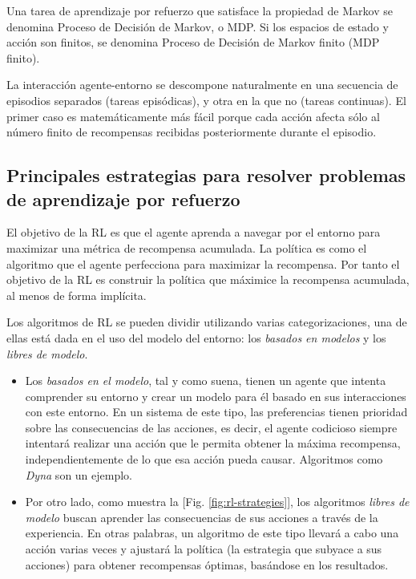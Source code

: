 Una tarea de aprendizaje por refuerzo que satisface la propiedad de Markov se denomina Proceso de Decisión de Markov, o MDP. Si los espacios de estado y acción son finitos, se denomina Proceso de Decisión de Markov finito (MDP finito).

La interacción agente-entorno se descompone naturalmente en una secuencia de episodios separados (tareas episódicas), y otra en la que no (tareas continuas). El primer caso es matemáticamente más fácil porque cada acción afecta sólo al número finito de recompensas recibidas posteriormente durante el episodio.

\subsection*{Principales estrategias para resolver problemas de aprendizaje por refuerzo}

El objetivo de la RL es que el agente aprenda a navegar por el entorno para maximizar una métrica de recompensa acumulada. La política es como el algoritmo que el agente perfecciona para maximizar la recompensa. Por tanto el objetivo de la RL es construir la política que máximice la recompensa acumulada, al menos de forma implícita.

Los algoritmos de RL se pueden dividir utilizando varias categorizaciones, una de ellas está dada en el uso del modelo del entorno: los \textit{basados en modelos} y los \textit{libres de modelo}.

\begin{itemize}
\item Los \textit{basados en el modelo}, tal y como suena, tienen un agente que intenta comprender su entorno y crear un modelo para él basado en sus interacciones con este entorno. En un sistema de este tipo, las preferencias tienen prioridad sobre las consecuencias de las acciones, es decir, el agente codicioso siempre intentará realizar una acción que le permita obtener la máxima recompensa, independientemente de lo que esa acción pueda causar. Algoritmos como \textit{Dyna} son un ejemplo.

\item Por otro lado, como muestra la [Fig. \ref{fig:rl-strategies}], los algoritmos \textit{libres de modelo} buscan aprender las consecuencias de sus acciones a través de la experiencia. En otras palabras, un algoritmo de este tipo llevará a cabo una acción varias veces y ajustará la política (la estrategia que subyace a sus acciones) para obtener recompensas óptimas, basándose en los resultados.
\end{itemize}

